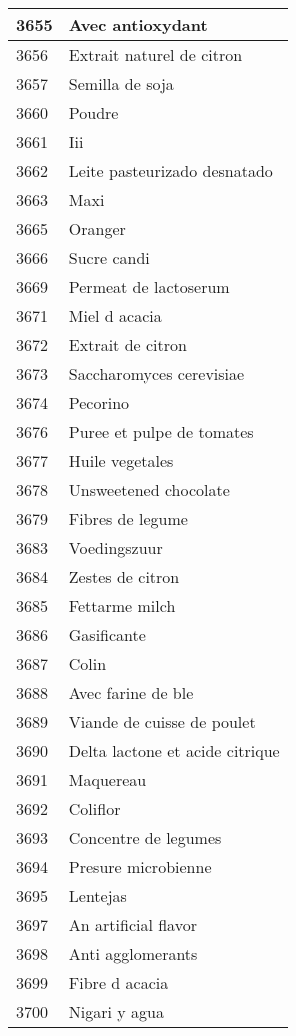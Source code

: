 \begin{longtable}{|l|l|}
3655 & Avec antioxydant \\ \hline 
3656 & Extrait naturel de citron \\ \hline 
3657 & Semilla de soja \\ \hline 
3660 & Poudre \\ \hline 
3661 & Iii \\ \hline 
3662 & Leite pasteurizado desnatado \\ \hline 
3663 & Maxi \\ \hline 
3665 & Oranger \\ \hline 
3666 & Sucre candi \\ \hline 
3669 & Permeat de lactoserum \\ \hline 
3671 & Miel d acacia \\ \hline 
3672 & Extrait de citron \\ \hline 
3673 & Saccharomyces cerevisiae \\ \hline 
3674 & Pecorino \\ \hline 
3676 & Puree et pulpe de tomates \\ \hline 
3677 & Huile vegetales \\ \hline 
3678 & Unsweetened chocolate \\ \hline 
3679 & Fibres de legume \\ \hline 
3683 & Voedingszuur \\ \hline 
3684 & Zestes de citron \\ \hline 
3685 & Fettarme milch \\ \hline 
3686 & Gasificante \\ \hline 
3687 & Colin \\ \hline 
3688 & Avec farine de ble \\ \hline 
3689 & Viande de cuisse de poulet \\ \hline 
3690 & Delta lactone et acide citrique \\ \hline 
3691 & Maquereau \\ \hline 
3692 & Coliflor \\ \hline 
3693 & Concentre de legumes \\ \hline 
3694 & Presure microbienne \\ \hline 
3695 & Lentejas \\ \hline 
3697 & An artificial flavor \\ \hline 
3698 & Anti agglomerants \\ \hline 
3699 & Fibre d acacia \\ \hline 
3700 & Nigari y agua \\ \hline 

\end{longtable}
